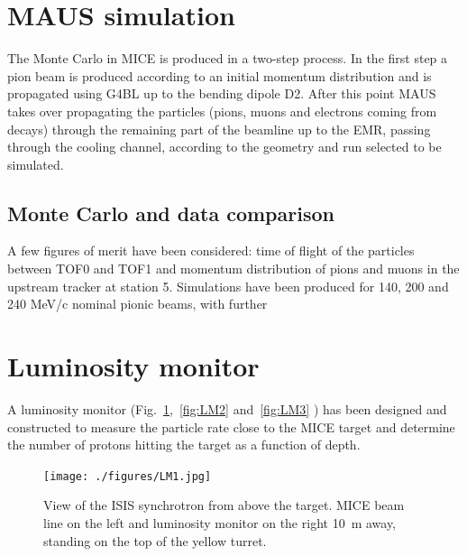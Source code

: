 \documentclass[a4paper,11pt]{article}
\begin{document}
\section{MAUS simulation}

The Monte Carlo in MICE is produced in a two-step process. In the first step a pion beam is produced according to an initial momentum distribution and is propagated using G4BL up to the bending dipole D2. After this point MAUS takes over propagating the particles (pions, muons and electrons coming from decays) through the remaining part of the beamline up to the EMR, passing through the cooling channel, according to the geometry and run selected to be simulated. 

\subsection{Monte Carlo and data comparison}

A few figures of merit have been considered: time of flight of the particles between TOF0 and TOF1 and momentum distribution of pions and muons in the upstream tracker at station 5.
Simulations have been produced for 140, 200 and 240 MeV/c nominal pionic beams, with further 

\section{Luminosity monitor}

A luminosity monitor (Fig.~\ref{fig:LM1},~\ref{fig:LM2} and~\ref{fig:LM3} ) has been designed and constructed to measure the particle rate close to the MICE target and determine the number of protons hitting the target as a function of depth.
\begin{figure}
  \begin{center}
    \texttt{[image: ./figures/LM1.jpg]}
    \caption{View of the ISIS synchrotron from above the target. MICE beam line on the left and luminosity monitor on the right 10~m away, standing on the top of the yellow turret.}
    \label{fig:LM1}
  \end{center}
\end{figure}
\end{document}
